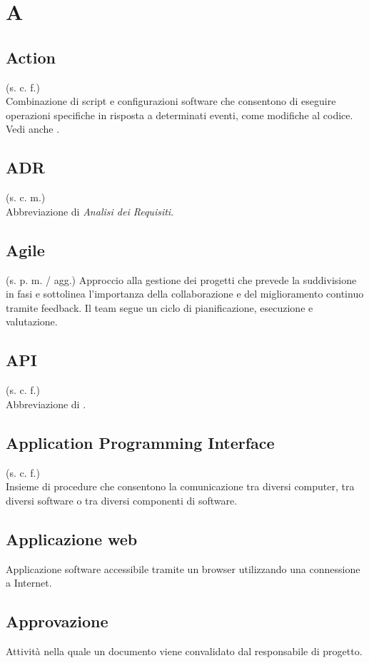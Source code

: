 \section{A}
    \subsection{Action}
    (s. c. f.)\\
    Combinazione di script e configurazioni software che consentono di eseguire operazioni 
    specifiche in risposta a determinati eventi, come modifiche al codice.
    Vedi anche .
    \subsection{ADR}
    (s. c. m.)\\
    Abbreviazione di \textit{Analisi dei Requisiti}.
    \subsection{Agile}
    (s. p. m. / agg.)
    Approccio alla gestione dei progetti che prevede la suddivisione in fasi e sottolinea 
    l'importanza della collaborazione e del miglioramento continuo tramite feedback. 
    Il team segue un ciclo di pianificazione, esecuzione e valutazione.
    \subsection{API}
    (s. c. f.)\\
    Abbreviazione di .
    \subsection{Application Programming Interface}
    \label{Application Programming Interface}
    (s. c. f.)\\
    Insieme di procedure che consentono la comunicazione tra diversi computer, tra diversi 
    software o tra diversi componenti di software.
    \subsection{Applicazione web}
    \label{Applicazione web}
    Applicazione software accessibile tramite un browser utilizzando una 
    connessione a Internet.
    \subsection{Approvazione}
    Attività nella quale un documento viene convalidato dal responsabile di progetto.
